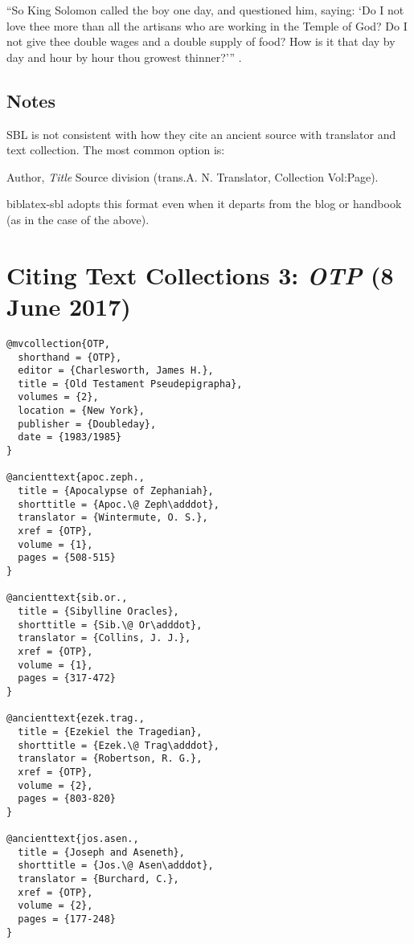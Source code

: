 \documentclass[a4paper]{article}
\newcommand*{\pkg}[1]{\textsf{#1}}
\renewcommand\footnote[1]{##1}%
\begin{document}
\begin{verbcite}
  “So King Solomon called the boy one day, and questioned him, saying: ‘Do I
  not love thee more than all the artisans who are working in the Temple of
  God? Do I not give thee double wages and a double supply of food? How is it
  that day by day and hour by hour thou growest thinner?’”
  .
\end{verbcite}
\exampleancientsources
\examplesecondarysources
\examplebibliography

\subsection{Notes}

SBL is not consistent with how they cite an ancient source with translator and
text collection. The most common option is:

Author, \emph{Title} Source division (trans.\@ A. N. Translator, Collection
Vol:Page).

\pkg{biblatex-sbl} adopts this format even when it departs from the blog or
handbook (as in the case of the  above).


\section{Citing Text Collections 3: \emph{OTP} (8 June 2017)}

\begin{verbatim}
@mvcollection{OTP,
  shorthand = {OTP},
  editor = {Charlesworth, James H.},
  title = {Old Testament Pseudepigrapha},
  volumes = {2},
  location = {New York},
  publisher = {Doubleday},
  date = {1983/1985}
}

@ancienttext{apoc.zeph.,
  title = {Apocalypse of Zephaniah},
  shorttitle = {Apoc.\@ Zeph\adddot},
  translator = {Wintermute, O. S.},
  xref = {OTP},
  volume = {1},
  pages = {508-515}
}

@ancienttext{sib.or.,
  title = {Sibylline Oracles},
  shorttitle = {Sib.\@ Or\adddot},
  translator = {Collins, J. J.},
  xref = {OTP},
  volume = {1},
  pages = {317-472}
}

@ancienttext{ezek.trag.,
  title = {Ezekiel the Tragedian},
  shorttitle = {Ezek.\@ Trag\adddot},
  translator = {Robertson, R. G.},
  xref = {OTP},
  volume = {2},
  pages = {803-820}
}

@ancienttext{jos.asen.,
  title = {Joseph and Aseneth},
  shorttitle = {Jos.\@ Asen\adddot},
  translator = {Burchard, C.},
  xref = {OTP},
  volume = {2},
  pages = {177-248}
}
\end{verbatim}
\end{document}
